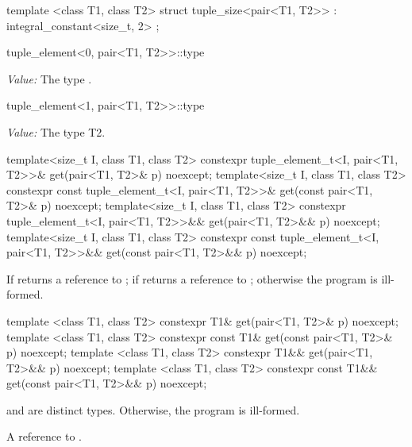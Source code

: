 %
\begin{itemdecl}
template <class T1, class T2>
  struct tuple_size<pair<T1, T2>> : integral_constant<size_t, 2> { };
\end{itemdecl}

%
\begin{itemdecl}
tuple_element<0, pair<T1, T2>>::type
\end{itemdecl}
\begin{itemdescr}
\pnum\textit{Value:} The type .
\end{itemdescr}

%
\begin{itemdecl}
tuple_element<1, pair<T1, T2>>::type
\end{itemdecl}
\begin{itemdescr}
\pnum\textit{Value:} The type T2.
\end{itemdescr}

%
\begin{itemdecl}
template<size_t I, class T1, class T2>
  constexpr tuple_element_t<I, pair<T1, T2>>& get(pair<T1, T2>& p) noexcept;
template<size_t I, class T1, class T2>
  constexpr const tuple_element_t<I, pair<T1, T2>>& get(const pair<T1, T2>& p) noexcept;
template<size_t I, class T1, class T2>
  constexpr tuple_element_t<I, pair<T1, T2>>&& get(pair<T1, T2>&& p) noexcept;
template<size_t I, class T1, class T2>
  constexpr const tuple_element_t<I, pair<T1, T2>>&& get(const pair<T1, T2>&& p) noexcept;
\end{itemdecl}
\begin{itemdescr}

\pnum
\returns If  returns a reference to ;
if  returns a reference to ;
otherwise the program is ill-formed.
\end{itemdescr}

%
\begin{itemdecl}
template <class T1, class T2>
  constexpr T1& get(pair<T1, T2>& p) noexcept;
template <class T1, class T2>
  constexpr const T1& get(const pair<T1, T2>& p) noexcept;
template <class T1, class T2>
  constexpr T1&& get(pair<T1, T2>&& p) noexcept;
template <class T1, class T2>
  constexpr const T1&& get(const pair<T1, T2>&& p) noexcept;
\end{itemdecl}
\begin{itemdescr}
\pnum
\requires {} and  are distinct types. Otherwise, the program is ill-formed.

\pnum
\returns A reference to .
\end{itemdescr}

